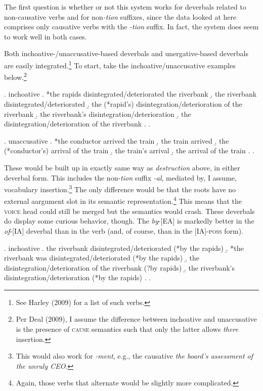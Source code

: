\documentclass[12pt]{article}
\begin{document}
The first question is whether or not this system works for deverbals related to non-causative verbs and for non\textit{-tion} suffixes, since the data looked at here comprises only causative verbs with the \textit{-tion} suffix. In fact, the system does seem to work well in both cases.

Both inchoative-/unaccusative-based deverbals and unergative-based deverbals are easily integrated.\footnote{ See Harley (2009) for a list of such verbs.} To start, take the inchoative/unaccusative examples below.\footnote{ Per Deal (2009), I assume the difference between inchoative and unaccusative is the presence of \textsc{cause} semantics such that only the latter allows \textit{there} insertion.}

\singlespacing

\ex. inchoative
\a. *the rapids disintegrated/deteriorated the riverbank 
\b. the riverbank disintegrated/deteriorated
\b. the (*rapid's) disintegration/deterioration of the riverbank
\b. the riverbank's disintegration/deterioration
\b. the disintegration/deterioration of the riverbank
\z. \z. 

\ex. unaccusative
\a. *the conductor arrived the train
\b. the train arrived
\b. the (*conductor's) arrival of the train
\b. the train's arrival
\b. the arrival of the train
\z. \z. \par

\doublespacing

These would be built up in exactly same way as \textit{destruction} above, in either deverbal form. This includes the non-\textit{tion} suffix \textit{-al}, mediated by, I assume, vocabulary insertion.\footnote{ This would also work for \textit{-ment}, e.g., the causative \textit{the board's assessment of the unruly CEO}.} The only difference would be that the roots have no external aargument slot in its semantic representation.\footnote{ Again, those verbs that alternate would be slightly more complicated.} This means that the \textsc{voice} head could still be merged but the semantics would crash. These deverbals do display some curious behavior, though. The \textit{by}-[EA] is markedly better in the \textit{of}-[IA] deverbal than in the verb (and, of course, than in the [IA]-\textsc{poss} form).

\singlespacing

\ex. inchoative
\a. the riverbank disintegrated/deteriorated (*by the rapids)
\b. *the riverbank was disintegrated/deteriorated (*by the rapids)
\b. the disintegration/deterioration of the riverbank (?by rapids)
\b. the riverbank's disintegration/deterioration (*by the rapids)
\z. \z.
\end{document}

